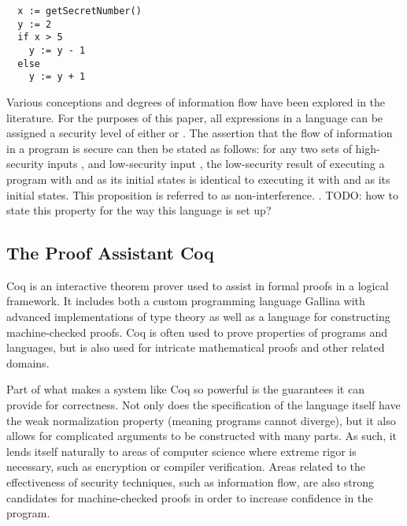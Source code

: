 \documentclass[12pt]{report}
\begin{document}
\begin{verbatim}
  x := getSecretNumber()
  y := 2
  if x > 5
    y := y - 1
  else
    y := y + 1
\end{verbatim}


 Various conceptions and degrees of information flow have been
explored in the literature. For the purposes of this paper, all
expressions in a language can be assigned a security level of either
 or . The assertion that the flow of information in
a program is secure can then be stated as follows: for any two sets
of high-security inputs ,  and low-security input , the
low-security result of executing a program with  and  as its
initial states is identical to executing it with  and  as its
initial states. This proposition is referred to as
non-interference. . TODO: how to state this property for the way this
language is set up? 

\subsection{The Proof Assistant Coq}



 Coq is an interactive theorem prover used to assist in formal
proofs in a logical framework. It includes both a custom programming
language Gallina with advanced implementations of type theory as well
as a language for constructing machine-checked proofs. Coq is often
used to prove properties of programs and languages, but is also used
for intricate mathematical proofs and other related domains.


Part of what makes a system like Coq so powerful is the guarantees it
can provide for correctness. Not only does the specification of the
language itself have the weak normalization property (meaning
programs cannot diverge), but it also allows for complicated
arguments to be constructed with many parts. As such, it lends itself
naturally to areas of computer science where extreme rigor is
necessary, such as encryption or compiler verification. Areas related
to the effectiveness of security techniques, such as information
flow, are also strong candidates for machine-checked proofs in order
to increase confidence in the program.
\end{document}
